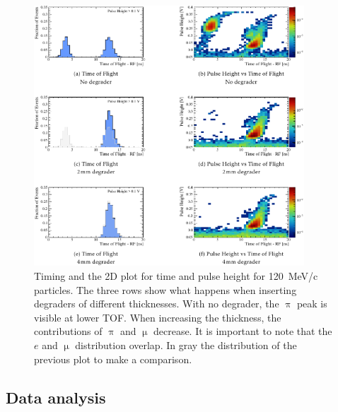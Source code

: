 \begin{refsection}
        \begin{figure}
            \centering
            \includegraphics[width=0.9\textwidth]{Figures/muEDM_Dec2021/muEDM_beamtime2021_TOF.png}
            \caption{Timing and the 2D plot for time and pulse height for \SI{120}{MeV/c} particles. The three rows show what happens when inserting degraders of different thicknesses.
            With no degrader, the $\uppi$ peak is visible at lower TOF.
            When increasing the thickness, the contributions of $\uppi$ and $\upmu$ decrease.
            It is important to note that the $e$ and $\upmu$ distribution overlap.
            In gray the distribution of the previous plot to make a comparison.}
            \label{fig:muEDM:bt2021:TOF}
        \end{figure}

    \subsection{Data analysis}

\end{refsection}
